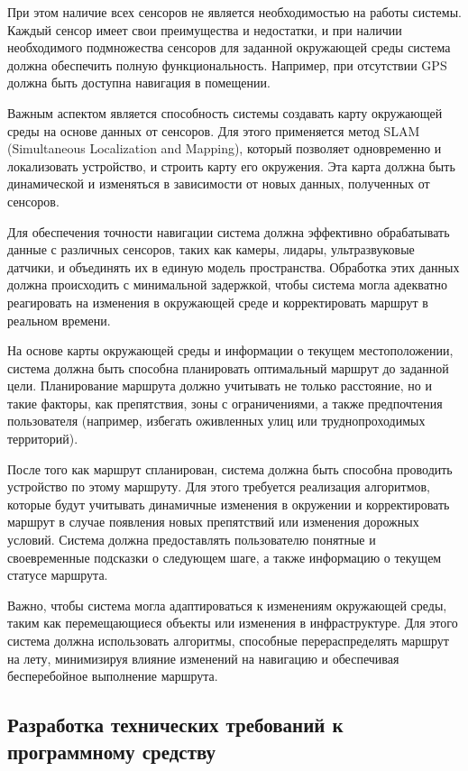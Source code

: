 При этом наличие всех сенсоров не является необходимостью на работы системы.
Каждый сенсор имеет свои преимущества и недостатки, и при наличии необходимого
подмножества сенсоров для заданной окружающей среды система должна обеспечить
полную функциональность. Например, при отсутствии GPS должна быть доступна
навигация в помещении.

Важным аспектом является способность системы создавать карту окружающей среды на
основе данных от сенсоров. Для этого применяется метод SLAM (Simultaneous
Localization and Mapping), который позволяет одновременно и локализовать
устройство, и строить карту его окружения. Эта карта должна быть динамической и
изменяться в зависимости от новых данных, полученных от сенсоров.

Для обеспечения точности навигации система должна эффективно обрабатывать данные
с различных сенсоров, таких как камеры, лидары, ультразвуковые датчики, и
объединять их в единую модель пространства. Обработка этих данных должна
происходить с минимальной задержкой, чтобы система могла адекватно реагировать
на изменения в окружающей среде и корректировать маршрут в реальном времени.

На основе карты окружающей среды и информации о текущем местоположении, система
должна быть способна планировать оптимальный маршрут до заданной цели.
Планирование маршрута должно учитывать не только расстояние, но и такие факторы,
как препятствия, зоны с ограничениями, а также предпочтения пользователя
(например, избегать оживленных улиц или труднопроходимых территорий).

После того как маршрут спланирован, система должна быть способна проводить
устройство по этому маршруту. Для этого требуется реализация алгоритмов, которые
будут учитывать динамичные изменения в окружении и корректировать маршрут в
случае появления новых препятствий или изменения дорожных условий. Система
должна предоставлять пользователю понятные и своевременные подсказки о следующем
шаге, а также информацию о текущем статусе маршрута.

Важно, чтобы система могла адаптироваться к изменениям окружающей среды, таким
как перемещающиеся объекты или изменения в инфраструктуре. Для этого система
должна использовать алгоритмы, способные перераспределять маршрут на лету,
минимизируя влияние изменений на навигацию и обеспечивая бесперебойное
выполнение маршрута.

\subsection{Разработка технических требований к программному средству}


